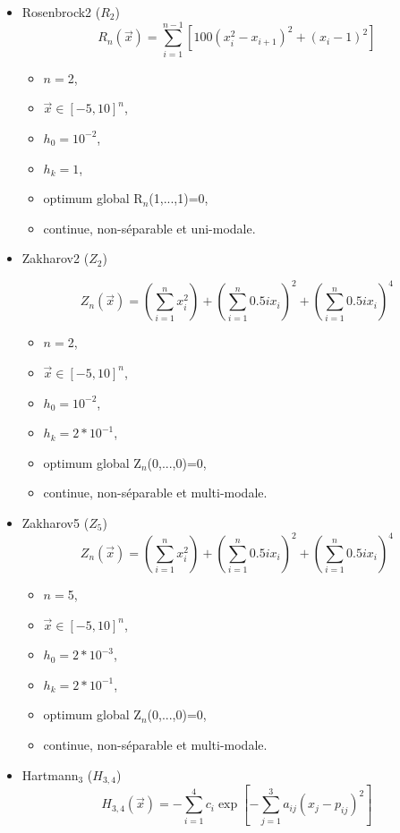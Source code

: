 \begin{itemize}
	\bigskip
	\bigskip
		\bigskip
	\bigskip
	\item
	Rosenbrock2 ($R_2$)\\$$R_n(\overrightarrow{x})= \sum_{i=1}^{n-1} [100(x_i^2-x_{i+1})^2+(x_i -1)^2]$$
	\begin{itemize}[label={$\circ$}]
		\item $n=$2, 
		\item $\overrightarrow{x} \in [-5,10]^n$,
		\item $h_0=10^{-2}$,
		\item $h_k=1$,
		\item optimum global R$_n$(1,...,1)=0,
		\item continue, non-séparable et uni-modale.
	\end{itemize}
	\bigskip
	\item Zakharov2 ($Z_2$)
	
	\bigskip
	
	$$Z_n(\overrightarrow{x})= \left(\sum_{i=1}^{n}x_i^2\right) + \left(\sum_{i=1}^{n} 0.5ix_i\right)^2 + \left(\sum_{i=1}^{n} 0.5ix_i\right)^4$$
	
	\bigskip
	
	\begin{itemize}[label={$\circ$}]
		\item $n=$2,
		\item $\overrightarrow{x} \in [-5,10]^n$,
		\item $h_0=10^{-2}$,
		\item $h_k=2*10^{-1}$,
		\item optimum global Z$_n$(0,...,0)=0,
		\item continue, non-séparable et multi-modale.
	\end{itemize}
	
	\bigskip
	\bigskip
	\item Zakharov5 ($Z_5$)\\$$Z_n(\overrightarrow{x})= \left(\sum_{i=1}^{n}x_i^2\right) + \left(\sum_{i=1}^{n} 0.5ix_i\right)^2 + \left(\sum_{i=1}^{n} 0.5ix_i\right)^4$$
	
	\begin{itemize}[label={$\circ$}]
		\item $n=$5,
		\item $\overrightarrow{x} \in [-5,10]^n$,
		\item $h_0=2*10^{-3}$,
		\item $h_k=2*10^{-1}$,
		\item optimum global Z$_n$(0,...,0)=0,
		\item continue, non-séparable et multi-modale.
	\end{itemize}
	\bigskip
	\bigskip
	\item
	Hartmann$_3$ ($H_{3,4}$)\\$$H_{3,4}(\overrightarrow{x})= -\sum_{i=1}^{4} c_i \exp[-\sum_{j=1}^{3}a_{ij}(x_j-p_{ij})^2]$$
	

\end{itemize}
